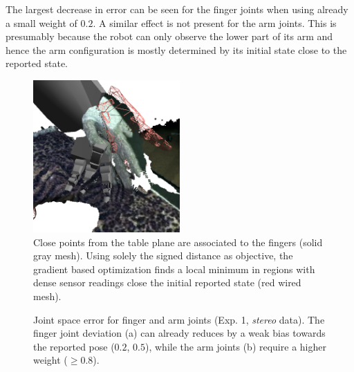 The largest decrease in error can be seen for the finger joints when using already a small weight of $0.2$. A similar effect is not present for the arm joints. This is presumably because the robot can only observe the lower part of its arm and hence the arm configuration is mostly determined by its initial state close to the reported state.

\begin{figure}
\centering
\includegraphics[width=0.5\textwidth]{images/eval_prior/fingers_in_table.png}
\caption[Wrong association of data points]{Close points from the table plane are associated to the fingers (solid gray mesh). Using solely the signed distance as objective, the gradient based optimization finds a local minimum in regions with dense sensor readings close the initial reported state (red wired mesh).}
\label{fig:no_prior_fingers_table}
\end{figure}

\begin{figure}[h]
\centering
{}
%
\caption[Joint space error (Exp. 1, stereo)]{Joint space error for finger and arm joints (Exp. 1, \textit{stereo} data). The finger joint deviation (a) can already reduces by a weak bias towards the reported pose ($0.2$, $0.5$), while the arm joints (b) require a higher weight ($\geq0.8$).}
\label{fig:stereo_joint_error}
\end{figure}

